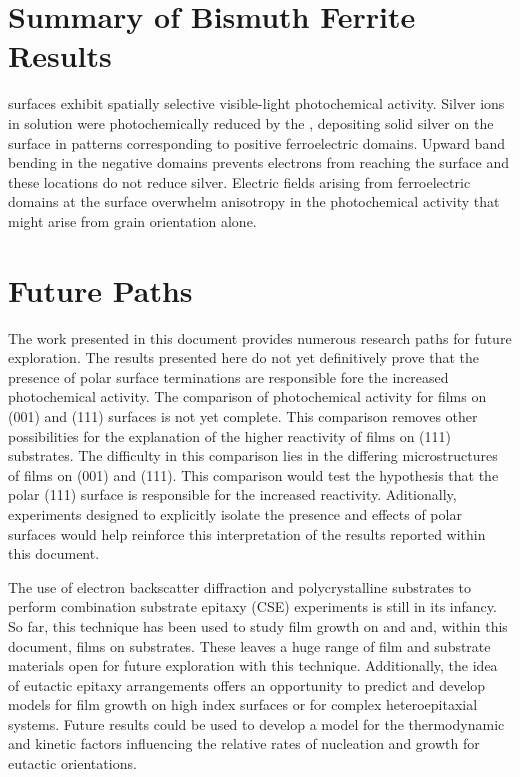 \section{Summary of Bismuth Ferrite Results}
\label{sec:conclusions.bfo.summary}

 surfaces exhibit spatially selective visible-light photochemical activity. Silver ions in solution were photochemically reduced by the , depositing solid silver on the surface in patterns corresponding to positive ferroelectric domains. Upward band bending in the negative domains prevents electrons from reaching the surface and these locations do not reduce silver. Electric fields arising from ferroelectric domains at the surface overwhelm anisotropy in the photochemical activity that might arise from grain orientation alone.

\section{Future Paths}
\label{sec:conclusions.future.paths}

The work presented in this document provides numerous research paths for future exploration. The results presented here do not yet definitively prove that the presence of polar surface terminations are responsible fore the increased photochemical activity. The comparison of photochemical activity for  films on (001) and (111) surfaces is not yet complete. This comparison removes other possibilities for the explanation of the higher reactivity of films on (111) substrates. The difficulty in this comparison lies in the differing microstructures of films on (001) and (111). This comparison would test the hypothesis that the polar (111) surface is responsible for the increased reactivity. Aditionally, experiments designed to explicitly isolate the presence and effects of polar surfaces would help reinforce this interpretation of the results reported within this document.

The use of electron backscatter diffraction  and polycrystalline substrates to perform combination substrate epitaxy (CSE) experiments is still in its infancy. So far, this technique has been used to study  film growth on  and  and, within this document,  films on  substrates. These leaves a huge range of film and substrate materials open for future exploration with this technique. Additionally, the idea of eutactic epitaxy arrangements offers an opportunity to predict and develop models for film growth on high index surfaces or for complex heteroepitaxial systems. Future results could be used to develop a model for the thermodynamic and kinetic factors influencing the relative rates of nucleation and growth for eutactic orientations.

